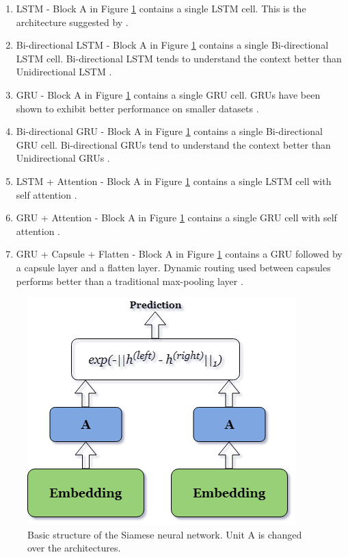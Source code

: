 \begin{enumerate}
	\item LSTM - Block A in Figure \ref{fig:siamese} contains a single LSTM cell. This is the architecture suggested by \textcite{Mueller_Thyagarajan_2016}. 
	
	\item Bi-directional LSTM - Block A in Figure \ref{fig:siamese} contains a single Bi-directional LSTM cell. Bi-directional LSTM tends to understand the context better than Unidirectional LSTM \autocite{650093}.
	
	\item GRU - Block A in Figure \ref{fig:siamese} contains a single GRU cell. GRUs have been shown to exhibit better performance on smaller datasets \autocite{Chung2014EmpiricalEO}. 
	
	\item Bi-directional GRU - Block A in Figure \ref{fig:siamese} contains a single Bi-directional GRU cell. Bi-directional GRUs tend to understand the context better than Unidirectional GRUs \autocite{vukotic:hal-01351733}.
	
	\item LSTM + Attention - Block A in Figure \ref{fig:siamese} contains a single LSTM cell with self attention \autocite{NIPS2017_3f5ee243}.
	
	\item GRU + Attention - Block A in Figure \ref{fig:siamese} contains a single GRU cell with self attention \autocite{NIPS2017_3f5ee243}.
	
	\item GRU + Capsule + Flatten - Block A in Figure \ref{fig:siamese} contains a GRU followed by a capsule layer and a flatten layer. Dynamic routing used between capsules performs better than a traditional max-pooling layer \autocite{NIPS2017_2cad8fa4}.
	
\end{enumerate}

\begin{figure}[ht]
	\centering
	\includegraphics[scale=0.5]{figures/semantic_textual_similarity/siamese_neural_networks/siamese_architecture.png}
	\caption[Basic structure of the Siamese neural network]{Basic structure of the Siamese neural network. Unit A is changed over the architectures.}
	\label{fig:siamese}
\end{figure}



